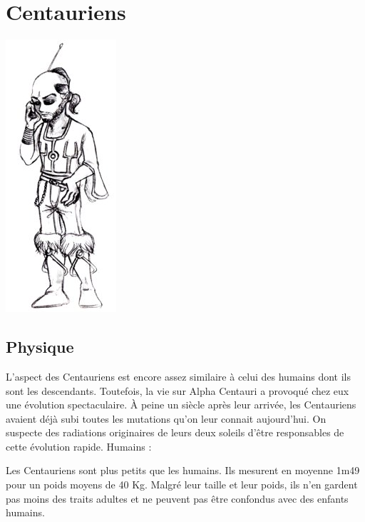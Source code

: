 
\chapter{Centauriens}

\begin{multicols}{2}

\begin{center}
	\includegraphics[scale=0.5]{Img/centaurien}
\end{center}

\section{Physique}

L'aspect des Centauriens est encore assez similaire à celui des humains dont ils sont les descendants. Toutefois, la vie sur Alpha Centauri a provoqué chez eux une évolution spectaculaire. À peine un siècle après leur arrivée, les Centauriens avaient déjà subi toutes les mutations qu'on leur connait aujourd'hui. On suspecte des radiations originaires de leurs deux soleils d'être responsables de cette évolution rapide. Humains :

Les Centauriens sont plus petits que les humains. Ils mesurent en moyenne 1m49 pour un poids moyens de 40 Kg. Malgré leur taille et leur poids, ils n'en gardent pas moins des traits adultes et ne peuvent pas être confondus avec des enfants humains. 


\end{multicols}
